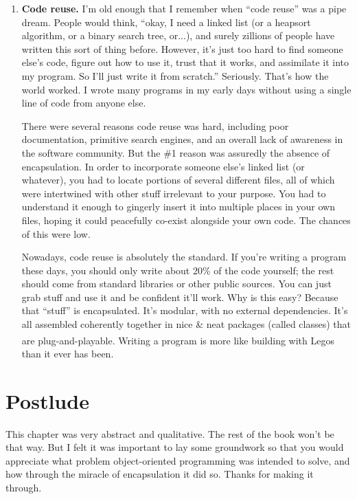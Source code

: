 \begin{enumerate}
\item \textbf{Code reuse.} I'm old enough that I remember when ``code reuse''
was a pipe dream. People would think, ``okay, I need a linked list
(or a heapsort algorithm, or a binary search tree, or...), and surely zillions
of people have written this sort of thing before. However, it's just too hard
to find someone else's code, figure out how to use it, trust that it works,
and assimilate it into my program. So I'll just write it from scratch.''
Seriously. That's how the world worked. I wrote many programs in my early days
without using a single line of code from anyone else.

There were several reasons code reuse was hard, including poor documentation,
primitive search engines, and an overall lack of awareness in the software
community. But the \#1 reason was assuredly the absence of encapsulation. In
order to incorporate someone else's linked list (or whatever), you had to
locate portions of several different files, all of which were intertwined with
other stuff irrelevant to your purpose. You had to understand it enough to
gingerly insert it into multiple places in your own files, hoping it could
peacefully co-exist alongside your own code. The chances of this were low.

Nowadays, code reuse is absolutely the standard. If you're writing a program
these days, you should only write about 20\% of the code yourself; the rest
should come from standard libraries or other public sources. You can just grab
stuff and use it and be confident it'll work. Why is this easy? Because that
``stuff'' is encapsulated. It's modular, with no external dependencies. It's
all assembled coherently together in nice \& neat packages (called classes)
that are plug-and-playable. Writing a program is more like building with
Legos\textsuperscript{\textregistered} than it ever has been.


\end{enumerate}

\section*{Postlude}

This chapter was very abstract and qualitative. The rest of the book won't be
that way. But I felt it was important to lay some groundwork so that you would
appreciate what problem object-oriented programming was intended to solve, and
how through the miracle of encapsulation it did so. Thanks for making it
through.


